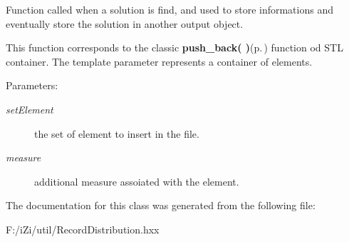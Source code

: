Function called when a solution is find, and used to store informations and eventually store the solution in another output object. 

This function corresponds to the classic {\bf push\_\-back( )}{\rm (p.\,\pageref{class_record_distribution_68c52a30268722a731552ee98657f761})} function od STL container. The template parameter represents a container of elements. \begin{Desc}
\item[Parameters:]
\begin{description}
\item[{\em set\-Element}]the set of element to insert in the file. \item[{\em measure}]additional measure assoiated with the element. \end{description}
\end{Desc}


The documentation for this class was generated from the following file:\begin{CompactItemize}
\item 
F:/i\-Zi/util/Record\-Distribution.hxx\end{CompactItemize}

